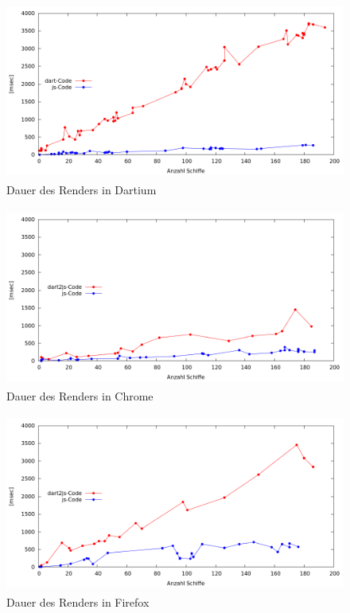 \begin {figure}[H]
\begin{center}
  \includegraphics[height=2.3in]{images/Dartium.png}
\end{center}
 \caption{Dauer des Renders in Dartium}
\end {figure}


\begin {figure}[H]
\begin{center}
  \includegraphics[height=2.3in]{images/Chrome.png}
\end{center}
 \caption{Dauer des Renders in Chrome}
\end {figure}


\begin {figure}[H]
\begin{center}
  \includegraphics[height=2.3in]{images/Firefox.png}
\end{center}
 \caption{Dauer des Renders in Firefox}
\end {figure}

